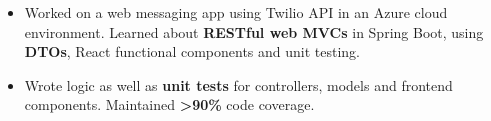 \documentclass[9pt]{developercv} %
\begin{document}
\begin{minipage}[t]{\textwidth}
	\begin{itemize}[noitemsep,topsep=0pt]
		\item Worked on a web messaging app using Twilio API in an Azure cloud environment.
		Learned about \textbf{RESTful web MVCs} in Spring Boot, using \textbf{DTOs},
		React functional components and unit testing. 
		\item Wrote logic as well as \textbf{unit tests} for controllers, models and frontend components. Maintained \textbf{>90\%} code coverage.
	\end{itemize}
\end{minipage}

\end{document}
